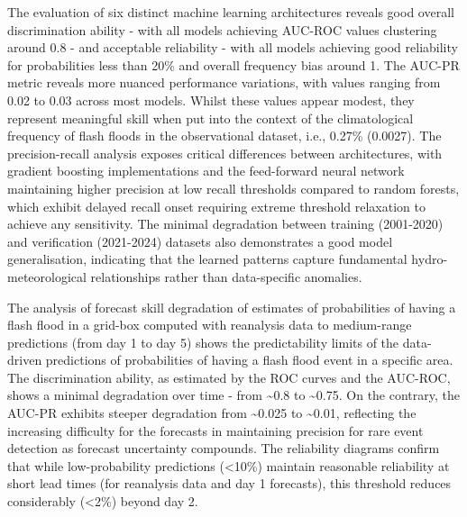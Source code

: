 The  evaluation of six distinct machine learning architectures reveals good overall discrimination ability - with all models achieving AUC-ROC values clustering around 0.8 - and acceptable reliability - with all models achieving good reliability for probabilities less than 20\% and overall frequency bias around 1. The AUC-PR metric reveals more nuanced performance variations, with values ranging from 0.02 to 0.03 across most models. Whilst these values appear modest, they represent meaningful skill when put into the context of the climatological frequency of flash floods in the observational dataset, i.e., 0.27\% (0.0027). The precision-recall analysis exposes critical differences between architectures, with gradient boosting implementations and the feed-forward neural network maintaining higher precision at low recall thresholds compared to random forests, which exhibit delayed recall onset requiring extreme threshold relaxation to achieve any sensitivity. The minimal degradation between training (2001-2020) and verification (2021-2024) datasets also demonstrates a good model generalisation, indicating that the learned patterns capture fundamental hydro-meteorological relationships rather than data-specific anomalies.

The  analysis of forecast skill degradation of estimates of probabilities of having a flash flood in a grid-box computed with reanalysis data to medium-range predictions (from day 1 to day 5) shows the predictability limits of the data-driven predictions of probabilities of having a flash flood event in a specific area. The discrimination ability, as estimated by the ROC curves and the AUC-ROC, shows a minimal degradation over time - from \sim0.8 to \sim0.75. On the contrary, the AUC-PR exhibits steeper degradation from \sim0.025 to \sim0.01, reflecting the increasing difficulty for the forecasts in maintaining precision for rare event detection as forecast uncertainty compounds. The reliability diagrams confirm that while low-probability predictions (<10\%) maintain reasonable reliability at short lead times (for reanalysis data and day 1 forecasts), this threshold reduces considerably (<2\%) beyond day 2.

